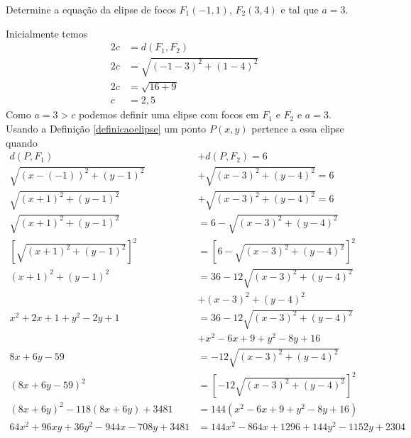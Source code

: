\begin{exemplo}
    Determine a equação da elipse de focos $F_1(-1, 1)$, $F_2(3, 4)$ e tal que $a = 3$.
    \begin{solucao}
        Inicialmente temos
        \begin{align*}
            2c & = d(F_1, F_2)                   \\
            2c & = \sqrt{(-1 - 3)^2 + (1 - 4)^2} \\
            2c & = \sqrt{16 + 9}                 \\
            c  & = 2,5
        \end{align*}
        Como $a = 3 > c$ podemos definir uma elipse com focos em $F_1$ e $F_2$ e $a = 3$. Usando a Definição \ref{definicaoelipse} um ponto $P(x, y)$
        pertence a essa elipse quando
        \begin{align*}
            d(P, F_1)                                   & + d(P, F_2)                                           = 6 \\
            \sqrt{(x - (-1))^2 + (y - 1)^2}             & + \sqrt{(x - 3)^2 + (y - 4)^2}  = 6                       \\
            \sqrt{(x + 1)^2 + (y - 1)^2}                & + \sqrt{(x - 3)^2 + (y - 4)^2}  = 6                       \\
            \sqrt{(x + 1)^2 + (y - 1)^2}                & = 6 - \sqrt{(x - 3)^2 + (y - 4)^2}                        \\
            \left[\sqrt{(x + 1)^2 + (y - 1)^2}\right]^2 & = \left[6 - \sqrt{(x - 3)^2 + (y - 4)^2}\right]^2         \\
            (x + 1)^2 + (y - 1)^2                       & = 36 - 12\sqrt{(x - 3)^2 + (y - 4)^2}                     \\ &+ (x - 3)^2 + (y - 4)^2         \\
            x^2 + 2x + 1 + y^2 - 2y + 1                 & = 36 - 12\sqrt{(x - 3)^2 + (y - 4)^2}                     \\ &+ x^2 - 6x + 9 + y^2 - 8y + 16 \\
            8x + 6y - 59                                & = -12\sqrt{(x - 3)^2 + (y - 4)^2}                         \\
            (8x + 6y - 59) ^2                           & = \left[-12\sqrt{(x - 3)^2 + (y - 4)^2}\right]^2          \\
            (8x + 6y)^2 - 118(8x + 6y) + 3481           & = 144(x^2 - 6x + 9 + y^2 - 8y + 16)                       \\
            64x^2 + 96xy + 36y^2 - 944x - 708y + 3481   & = 144x^2 - 864x + 1296 + 144y^2 - 1152y + 2304
        \end{align*}


\end{solucao}
\end{exemplo}
